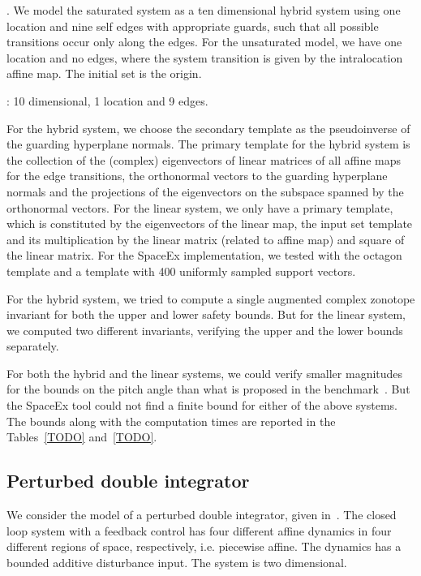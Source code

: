 .  We model the saturated system as a ten dimensional
hybrid system using one location and nine self edges with appropriate
guards, such that all possible transitions occur only along the edges.
For the unsaturated model, we have one location and no edges, where
the system transition is given by the intralocation affine map.  The
initial set is the origin.

: 10 dimensional, 1 location and 9 edges.

  For the hybrid system, we choose the secondary
template as the pseudoinverse of the guarding hyperplane normals.  The
primary template for the hybrid system is the collection of the
(complex) eigenvectors of linear matrices of all affine maps for the
edge transitions, the orthonormal vectors to the guarding hyperplane
normals and the projections of the eigenvectors on the subspace
spanned by the orthonormal vectors.  For the linear system, we only
have a primary template, which is constituted by the eigenvectors of
the linear map, the input set template and its multiplication by the
linear matrix (related to affine map) and square of the linear matrix.
For the SpaceEx implementation, we tested with the octagon template
and a template with 400 uniformly sampled support vectors.

For the hybrid system, we tried to compute a single augmented complex
zonotope invariant for both the upper and lower safety bounds.  But
for the linear system, we computed two different invariants, verifying
the upper and the lower bounds separately.

  For both the hybrid and the linear systems, we could
verify smaller magnitudes for the bounds on the pitch angle than what
is proposed in the benchmark~\cite{TODO}.  But the SpaceEx tool could
not find a finite bound for either of the above systems.  The bounds
along with the computation times are reported in the Tables~\ref{TODO}
and~\ref{TODO}.

%
\subsection{Perturbed double integrator}
We consider the model of a perturbed double integrator, given
in~\cite{TODO}.  The closed loop system with a feedback control has
four different affine dynamics in four different regions of space,
respectively, i.e. piecewise affine. The dynamics has a bounded
additive disturbance input.  The system is two dimensional.

